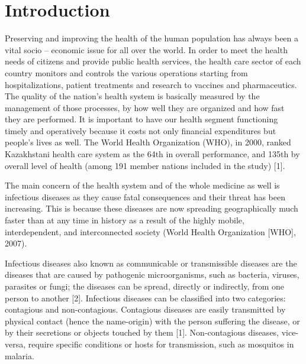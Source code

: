 \chapter{Introduction}

Preserving and improving the health of the human population has always been a vital socio – economic issue for all over the world. In order to meet the health needs of citizens and provide public health services, the health care sector of each country monitors and controls the various operations starting from hospitalizations, patient treatments and research to vaccines and pharmaceutics. The quality of the nation’s health system is basically measured by the management of those processes, by how well they are organized and how fast they are performed. It is important to have our health segment functioning timely and operatively because it costs not only financial expenditures but people’s lives as well. The World Health Organization (WHO), in 2000, ranked Kazakhstani health care system as the 64th in overall performance, and 135th by overall level of health (among 191 member nations included in the study) [1].

The main concern of the health system and of the whole medicine as well is infectious diseases as they cause fatal consequences and their threat has been increasing. This is because these diseases are now spreading geographically much faster than at any time in history as a result of the highly mobile, interdependent, and interconnected society (World Health Organization [WHO], 2007).

Infectious diseases also known as communicable or transmissible diseases are the diseases that are caused by pathogenic microorganisms, such as bacteria, viruses, parasites or fungi; the diseases can be spread, directly or indirectly, from one person to another [2]. Infectious diseases can be classified into two categories: contagious and non-contagious. Contagious diseases are easily transmitted by physical contact (hence the name-origin) with the person suffering the disease, or by their secretions or objects touched by them [1].  Non-contagious diseases, vice-versa, require specific conditions or hosts for transmission, such as mosquitos in malaria.

